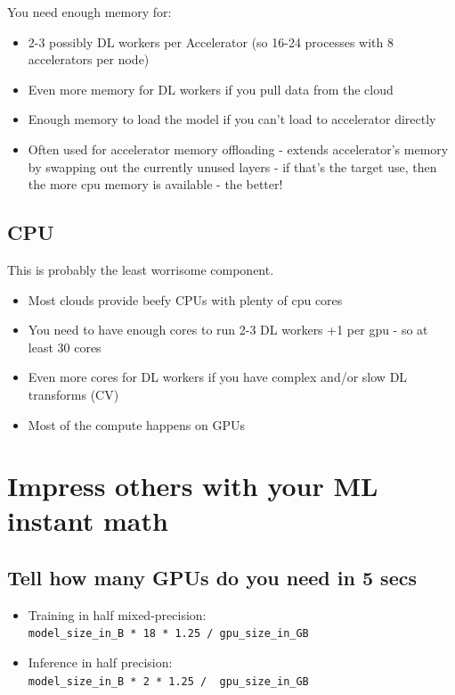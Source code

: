 \documentclass[
]{report}
\begin{document}
You need enough memory for:

\begin{itemize}
\item
  2-3 possibly DL workers per Accelerator (so 16-24 processes with 8
  accelerators per node)
\item
  Even more memory for DL workers if you pull data from the cloud
\item
  Enough memory to load the model if you can't load to accelerator
  directly
\item
  Often used for accelerator memory offloading - extends accelerator's
  memory by swapping out the currently unused layers - if that's the
  target use, then the more cpu memory is available - the better!
\end{itemize}

\subsection{CPU}\label{cpu}

This is probably the least worrisome component.

\begin{itemize}
\item
  Most clouds provide beefy CPUs with plenty of cpu cores
\item
  You need to have enough cores to run 2-3 DL workers +1 per gpu - so at
  least 30 cores
\item
  Even more cores for DL workers if you have complex and/or slow DL
  transforms (CV)
\item
  Most of the compute happens on GPUs
\end{itemize}

\section{Impress others with your ML instant
math}\label{impress-others-with-your-ml-instant-math}

\subsection{Tell how many GPUs do you need in 5
secs}\label{tell-how-many-gpus-do-you-need-in-5-secs}

\begin{itemize}
\item
  Training in half mixed-precision:
  \texttt{model\_size\_in\_B\ *\ 18\ *\ 1.25\ /\ gpu\_size\_in\_GB}
\item
  Inference in half precision:
  \texttt{model\_size\_in\_B\ *\ 2\ *\ 1.25\ /\ \ gpu\_size\_in\_GB}
\end{itemize}
\end{document}
